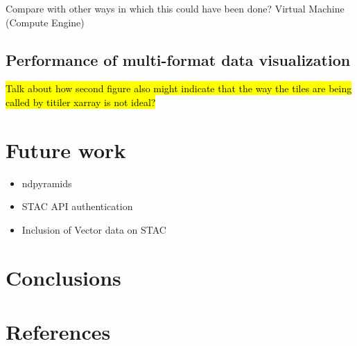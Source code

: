 \documentclass[
  oneside,
  open=any]{scrbook}
\providecommand{\tightlist}{%
  \setlength{\itemsep}{0pt}\setlength{\parskip}{0pt}}\usepackage{longtable,booktabs,array}
\begin{document}
Compare with other ways in which this could have been done? Virtual
Machine (Compute Engine)

\section{Performance of multi-format data
visualization}\label{performance-of-multi-format-data-visualization-1}

\hl{Talk about how second figure also might indicate that the way the tiles are being called by titiler xarray is not ideal?}

\chapter{Future work}\label{future-work}

\begin{itemize}
\tightlist
\item
  ndpyramids
\item
  STAC API authentication
\item
  Inclusion of Vector data on STAC
\end{itemize}

\chapter{Conclusions}\label{conclusions}

\chapter*{References}\label{references}
\end{document}
